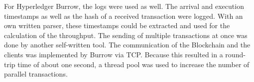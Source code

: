For Hyperledger Burrow, the logs were used as well. The arrival and execution timestamps as well as the hash of a 
received transaction were logged. With an own written parser, these timestamps could be extracted and used for the calculation
of the throughput. The sending of multiple transactions at once was done by another self-written tool. The communication of the
Blockchain and the clients was implemented by Burrow via TCP. Because this resulted in a round-trip time of about one second, a thread pool
was used to increase the number of parallel transactions. 